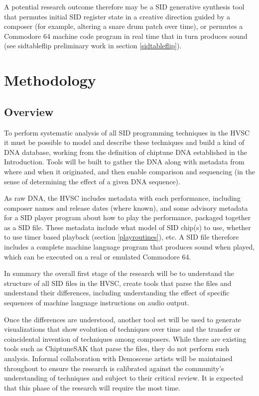 \documentclass[10pt]{article}
\begin{document}
\begin{multicols*}{2}
A potential research outcome therefore may be a SID generative synthesis tool that permutes initial SID register state in a creative direction guided by a composer (for example, altering a snare drum patch over time), or permutes a Commodore 64 machine code program in real time that in turn produces sound (see sidtableflip preliminary work in section \ref{sidtableflip}).

\section{Methodology}
\label{methodology}

    \subsection{Overview}

To perform systematic analysis of all SID programming techniques in the HVSC it must be possible to model and describe these techniques and build a kind of DNA database, working from the definition of chiptune DNA established in the Introduction. Tools will be built to gather the DNA along with metadata from where and when it originated, and then enable comparison and sequencing (in the sense of determining the effect of a given DNA sequence).

As raw DNA, the HVSC includes metadata with each performance, including composer names and release dates (where known), and some advisory metadata for a SID player program about how to play the performance, packaged together as a SID file\cite{sidfile}. These metadata include what model of SID chip(s) to use, whether to use timer based playback (section \ref{playroutines}), etc. A SID file therefore includes a complete machine language program that produces sound when played, which can be executed on a real or emulated Commodore 64.

In summary the overall first stage of the research will be to understand the structure of all SID files in the HVSC, create tools that parse the files and understand their differences, including understanding the effect of specific sequences of machine language instructions on audio output.

Once the differences are understood, another tool set will be used to generate visualizations that show evolution of techniques over time and the transfer or coincidental invention of techniques among composers. While there are existing tools such as ChiptuneSAK\cite{ChiptuneSAK} that parse the files, they do not perform such analysis. Informal collaboration with Demoscene artists will be maintained throughout to ensure the research is calibrated against the community’s understanding of techniques and subject to their critical review. It is expected that this phase of the research will require the most time.


\end{multicols*}
\end{document}
